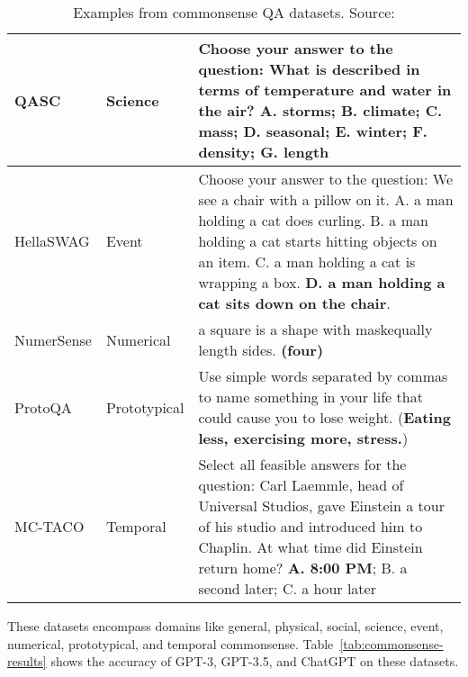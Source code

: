 \begin{table}[h!]
\begin{tabularx}{\textwidth}{|l|l|X|}
		\hline
		QASC          & Science      & Choose your answer to the question: What is described in terms of temperature and water in the air? A. storms; \textbf{B. climate}; C. mass; D. seasonal; E. winter; F. density; G. length                                                                               \\
		\hline
		HellaSWAG     & Event        & Choose your answer to the question: We see a chair with a pillow on it. A. a man holding a cat does curling. B. a man holding a cat starts hitting objects on an item. C. a man holding a cat is wrapping a box. \textbf{D. a man holding a cat sits down on the chair}. \\
		\hline
		NumerSense    & Numerical    & a square is a shape with \textlangle mask\textrangle equally length sides. \textbf{(four)}                                                                                                                                                                               \\
		\hline
		ProtoQA       & Prototypical & Use simple words separated by commas to name something in your life that could cause you to lose weight. (\textbf{Eating less, exercising more, stress.})                                                                                                                \\
		\hline
		MC-TACO       & Temporal     & Select all feasible answers for the question: Carl Laemmle, head of Universal Studios, gave Einstein a tour of his studio and introduced him to Chaplin. At what time did Einstein return home? \textbf{A. 8:00 PM}; B. a second later; C. a hour later                  \\
		\hline
	\end{tabularx}
	\caption{Examples from commonsense QA datasets. Source: \textcite{bian2024chatgpt}}
	\label{tab:dataset_examples}
\end{table}
These datasets encompass domains like general, physical, social, science, event, numerical, prototypical, and temporal commonsense.
Table~\ref{tab:commonsense-results} shows the accuracy of GPT-3, GPT-3.5, and ChatGPT on these datasets.
